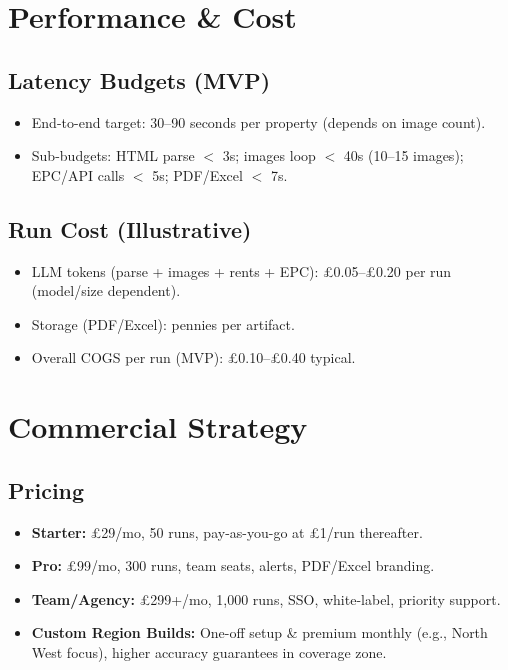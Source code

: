 \documentclass[12pt,a4paper]{article}
\begin{document}
\section{Performance \& Cost}
\subsection{Latency Budgets (MVP)}
\begin{itemize}[leftmargin=1.5em]
  \item End-to-end target: 30–90 seconds per property (depends on image count).
  \item Sub-budgets: HTML parse $<$ 3s; images loop $<$ 40s (10–15 images); EPC/API calls $<$ 5s; PDF/Excel $<$ 7s.
\end{itemize}

\subsection{Run Cost (Illustrative)}
\begin{itemize}[leftmargin=1.5em]
  \item LLM tokens (parse + images + rents + EPC): \pounds0.05–\pounds0.20 per run (model/size dependent).
  \item Storage (PDF/Excel): pennies per artifact.
  \item Overall COGS per run (MVP): \pounds0.10–\pounds0.40 typical.
\end{itemize}

\section{Commercial Strategy}
\subsection{Pricing}
\begin{itemize}[leftmargin=1.5em]
  \item \textbf{Starter:} \pounds29/mo, 50 runs, pay-as-you-go at \pounds1/run thereafter.
  \item \textbf{Pro:} \pounds99/mo, 300 runs, team seats, alerts, PDF/Excel branding.
  \item \textbf{Team/Agency:} \pounds299+/mo, 1{,}000 runs, SSO, white-label, priority support.
  \item \textbf{Custom Region Builds:} One-off setup \& premium monthly (e.g., North West focus), higher accuracy guarantees in coverage zone.
\end{itemize}
\end{document}
